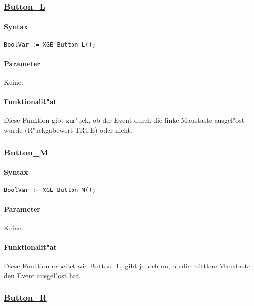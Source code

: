\subsubsection{\underline{Button\_L}}

\paragraph{Syntax}
\begin{verbatim}
BoolVar := XGE_Button_L();
\end{verbatim}

\paragraph{Parameter}
Keine.

\paragraph{Funktionalit"at}
Diese Funktion gibt zur"uck, ob der Event durch die linke Maustaste
ausgel"ost wurde (R"uckgabewert TRUE) oder nicht.


\subsubsection{\underline{Button\_M}}

\paragraph{Syntax}
\begin{verbatim}
BoolVar := XGE_Button_M();
\end{verbatim}

\paragraph{Parameter}
Keine.

\paragraph{Funktionalit"at}
Diese Funktion arbeitet wie Button\_L, gibt jedoch an, ob die mittlere
Maustaste den Event ausgel"ost hat.


\subsubsection{\underline{Button\_R}}

